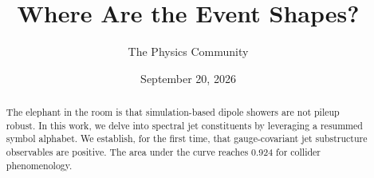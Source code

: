 \documentclass[11pt]{article}
\title{Where Are the Event Shapes?}
\author{The Physics Community}
\date{September 20, 2026}
\numberwithin{equation}{section}
\theoremstyle{definition}
\theoremstyle{remark}
\begin{document}
\maketitle
\begin{abstract}
The elephant in the room is that simulation-based dipole showers are not
pileup robust. In this work, we delve into spectral jet constituents by
leveraging a resummed symbol alphabet. We establish, for the first time,
that gauge-covariant jet substructure observables are positive. The area
under the curve reaches 0.924 for collider phenomenology.
\end{abstract}
\tableofcontents





\nocite{*}


\end{document}
